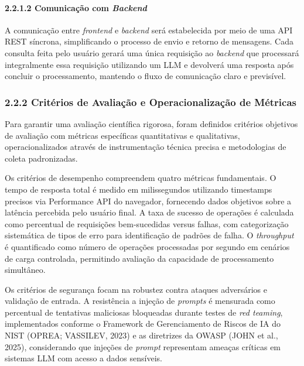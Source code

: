 \documentclass[
]{article}
\begin{document}
\paragraph{\texorpdfstring{2.2.1.2 Comunicação com
\emph{Backend}}{2.2.1.2 Comunicação com Backend}}\label{comunicauxe7uxe3o-com-backend}

A comunicação entre \emph{frontend} e \emph{backend} será estabelecida
por meio de uma API REST síncrona, simplificando o processo de envio e
retorno de mensagens. Cada consulta feita pelo usuário gerará uma única
requisição ao \emph{backend} que processará integralmente essa
requisição utilizando um LLM e devolverá uma resposta após concluir o
processamento, mantendo o fluxo de comunicação claro e previsível.

\subsubsection{2.2.2 Critérios de Avaliação e Operacionalização de
Métricas}\label{crituxe9rios-de-avaliauxe7uxe3o-e-operacionalizauxe7uxe3o-de-muxe9tricas}

Para garantir uma avaliação científica rigorosa, foram definidos
critérios objetivos de avaliação com métricas específicas quantitativas
e qualitativas, operacionalizados através de instrumentação técnica
precisa e metodologias de coleta padronizadas.

Os critérios de desempenho compreendem quatro métricas fundamentais. O
tempo de resposta total é medido em milissegundos utilizando timestamps
precisos via Performance API do navegador, fornecendo dados objetivos
sobre a latência percebida pelo usuário final. A taxa de sucesso de
operações é calculada como percentual de requisições bem-sucedidas
versus falhas, com categorização sistemática de tipos de erro para
identificação de padrões de falha. O \emph{throughput} é quantificado
como número de operações processadas por segundo em cenários de carga
controlada, permitindo avaliação da capacidade de processamento
simultâneo.

Os critérios de segurança focam na robustez contra ataques adversários e
validação de entrada. A resistência a injeção de \emph{prompts} é
mensurada como percentual de tentativas maliciosas bloqueadas durante
testes de \emph{red teaming}, implementados conforme o Framework de
Gerenciamento de Riscos de IA do NIST (OPREA; VASSILEV, 2023) e as
diretrizes da OWASP (JOHN et al., 2025), considerando que injeções de
\emph{prompt} representam ameaças críticas em sistemas LLM com acesso a
dados sensíveis.
\end{document}

